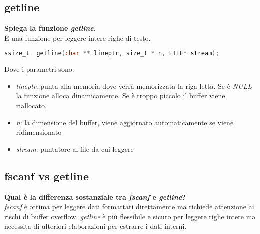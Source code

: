 \documentclass[a4paper,10pt]{article}
\theoremstyle{remark}
\theoremstyle{definition}
\theoremstyle{plain}
\theoremstyle{definition}
\theoremstyle{definition}
\theoremstyle{definition}
\theoremstyle{plain}
\theoremstyle{plain}
\begin{document}
\subsection{getline}
\textbf{Spiega la funzione \textit{getline}.}\\
È una funzione per leggere intere righe di testo.
\begin{lstlisting}[language=C]
	ssize_t	 getline(char ** lineptr, size_t * n, FILE* stream);
\end{lstlisting}
Dove i parametri sono:
\begin{itemize}
	\item \textit{lineptr}: punta alla memoria dove verrà memorizzata la riga letta. Se è \textit{NULL} la funzione alloca dinamicamente. Se è troppo piccolo il buffer viene riallocato.
	\item \textit{n}: la dimensione del buffer, viene aggiornato automaticamente se viene ridimensionato
	\item \textit{stream}: puntatore al file da cui leggere
\end{itemize}
\subsection{fscanf vs getline}
\textbf{Qual è la differenza sostanziale tra \textit{fscanf} e \textit{getline}?}\\
\textit{fscanf} è ottima per leggere dati formattati direttamente ma richiede attenzione ai rischi di buffer overflow. \textit{getline} è più flessibile e sicuro per leggere righe intere ma necessita di ulteriori elaborazioni per estrarre i dati interni.
\end{document}
